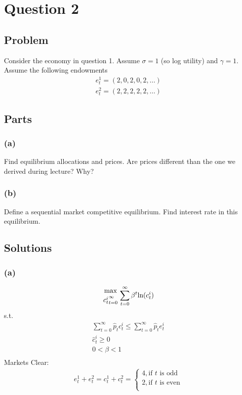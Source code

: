 \documentclass[10pt, a4paper]{article}
\begin{document}
\section*{Question 2}
  \subsection*{Problem}
    Consider the economy in question 1. Assume $\sigma = 1$ (so log utility) and $\gamma = 1$. Assume the following endowments
    \begin{gather*}
      e^1_t = (2,0,2,0,2,\ldots)\\
      e^2_t = (2,2,2,2,2,\ldots)
    \end{gather*}

  \subsection*{Parts}
    \subsubsection*{(a)}
      Find equilibrium allocations and prices. Are prices different than the one we derived during lecture? Why?

    \subsubsection*{(b)}
      Define a sequential market competitive equilibrium. Find interest rate in this equilibrium.

  \subsection*{Solutions}
    \subsubsection*{(a)}
      \begin{gather*}
        {\max\atop{c_t^i}_{t=0}^{\infty}}\sum\limits_{t=0}^{\infty}\beta^t\text{ln}(c_t^i)
      \end{gather*}
      s.t.
      \begin{gather*}
        \sum\limits_{t=0}^{\infty}\hat{p}_tc_t^i\leq\sum\limits_{t=0}^{\infty}\hat{p}_te_t^i \\
        \hat{c}_t^i\geq0 \\
        0<\beta<1 \\
      \end{gather*}
      Markets Clear:
      \begin{gather*}
        e_t^1+e_t^2 = c_t^1+c_t^2 = \begin{cases}
          4, \text{if $t$ is odd} \\
          2, \text{if $t$ is even} \\
        \end{cases}
      \end{gather*}
\end{document}
